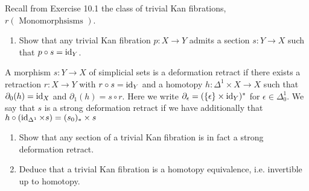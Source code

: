\begin{Exercise}
Recall from Exercise 10.1 the class of trivial Kan fibrations, $ r ( \text{ Monomorphsisms } ) $.

\begin{enumerate}[label=(\alph*)]
    \item 
    Show that any trivial Kan fibration $ p \colon X \to Y $ admits a section $ s \colon Y \to X $ such that $ p \circ s = \operatorname{id}_Y $.
    
\end{enumerate}

A morphism $ s \colon Y \to X $ of simplicial sets is a deformation retract if there exists a retraction $ r \colon X \to Y $ with $ r \circ s = \operatorname{id}_Y $ and a homotopy $ h \colon \Delta^1 \times X \to X $ such that $ \partial_0 ( h ) = \operatorname{id}_X $ and $ \partial_1 ( h ) = s \circ r $.
Here we write $ \partial_{ \epsilon} = ( \{ \epsilon \} \times \operatorname{id}_Y )^*$ for $ \epsilon \in \Delta^1_0 $.
We say that $ s $ is a strong deformation retract if we have additionally that $ h \circ  ( \operatorname{id}_{ \Delta^1 } \times s ) = ( s_0)_* \times s $

\begin{enumerate}[label=(\alph*), resume]
    \item 
    Show that any section of a trivial Kan fibration is in fact a strong deformation retract.

    \item 
    Deduce that a trivial Kan fibration is a homotopy equivalence, i.e. invertible up to homotopy.
\end{enumerate}
\end{Exercise}

